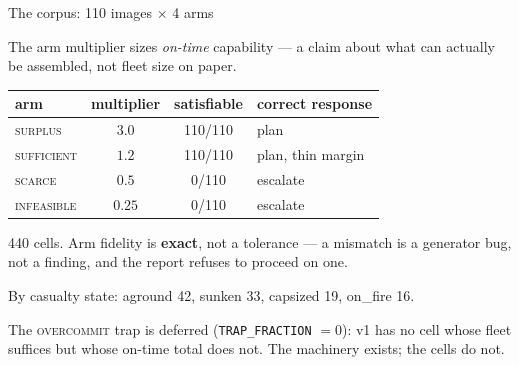 \documentclass[aspectratio=169,11pt]{beamer}
\newcommand{\cs}[1]{\textsc{\small #1}}
\begin{document}
\begin{frame}{The corpus: 110 images $\times$ 4 arms}

The arm multiplier sizes \emph{on-time} capability --- a claim about what can actually be
assembled, not fleet size on paper.

\medskip
\centering
\begin{tabular}{lccl}
\toprule
arm & multiplier & satisfiable & correct response \\
\midrule
\cs{surplus}    & $3.0$  & 110/110 & plan \\
\cs{sufficient} & $1.2$  & 110/110 & plan, thin margin \\
\cs{scarce}     & $0.5$  & 0/110   & escalate \\
\cs{infeasible} & $0.25$ & 0/110   & escalate \\
\bottomrule
\end{tabular}

\medskip
\raggedright\small
440 cells. Arm fidelity is \textbf{exact}, not a tolerance --- a mismatch is a generator
bug, not a finding, and the report refuses to proceed on one.

\medskip
By casualty state: aground 42, sunken 33, capsized 19, on\_fire 16.

\medskip
\textcolor{inkfaint}{The \cs{overcommit} trap is deferred (\texttt{TRAP\_FRACTION}
$=0$): v1 has no cell whose fleet suffices but whose on-time total does not. The
machinery exists; the cells do not.}

\end{frame}

\end{document}
